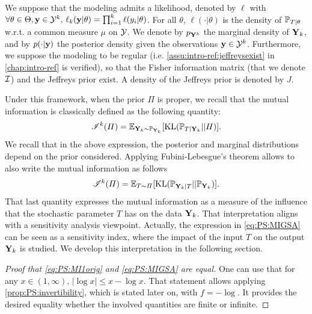 We suppose that the modeling admits a likelihood, denoted by $\ell$ with $\forall\theta\in\Theta,\mathbf{y}\in\mathcal{Y}^k,\, \ell_k(\mathbf{y}|\theta)=\prod_{i=1}^k\ell(y_i|\theta) $. For all $\theta$, $\ell(\cdot|\theta)$ is the density of $\mathbb{P}_{T|\theta}$ w.r.t. a common measure $\mu$ on $\mathcal{Y}$. We denote by $p_{\mathbf{Y}^k}$ the marginal density of $\mathbf{Y}_k$, and by $p(\cdot|\mathbf{y})$ the posterior density given the observations $\mathbf{y}\in\mathcal{Y}^k$. %
Furthermore, we suppose the modeling to be regular (i.e. \cref{assu:intro-ref:jeffreysexist} in \cref{chap:intro-ref} is verified), so that the Fisher information matrix (that we denote $\mathcal{I}$) and the Jeffreys prior exist. A density of the Jeffreys prior is denoted by $J$.



Under this framework, when the prior $\varPi$ is proper, %
we recall that the mutual information is classically defined as the following quantity:
    \begin{equation}\label{eq:PS:MI1orig}
        \mathscr{I}^k(\varPi) =  \mathbb{E}_{\mathbf{Y}_k\sim \mathbb{P}_{\mathbf{Y}_k}}[\text{KL}(\mathbb{P}_{T|\mathbf{Y}_k}||\varPi)] .
    \end{equation}
We recall that in the above expression, the posterior and marginal distributions depend on the prior considered. %
Applying Fubini-Lebesgue's theorem allows to also write the mutual information as follows
    \begin{equation}\label{eq:PS:MIGSA}
        \mathscr{I}^k(\varPi) = \mathbb{E}_{T\sim\varPi}[\text{KL}(\mathbb{P}_{\mathbf{Y}_k|T}||\mathbb{P}_{\mathbf{Y}_k}) ].
    \end{equation}
That last quantity expresses the mutual information as 
a measure of the influence that the stochastic parameter $T$ has on the data $\mathbf{Y}_k$.
That interpretation aligns with a sensitivity analysis viewpoint. Actually, the expression in \cref{eq:PS:MIGSA} can be seen as a sensitivity index, where the impact of the input $T$ on the output $\mathbf{Y}_k$ is studied. We develop this interpretation in the following section.


\begin{proof}[Proof that \cref{eq:PS:MI1orig} and \cref{eq:PS:MIGSA} are  equal]
    One can use that for any $x\in(1,\infty)$, $|\log x|\leq x-\log x$. That statement allows applying \cref{prop:PS:invertibility}, which is stated later on, with $f=-\log$. It provides the desired equality whether the involved quantities are finite or infinite.
\end{proof}



